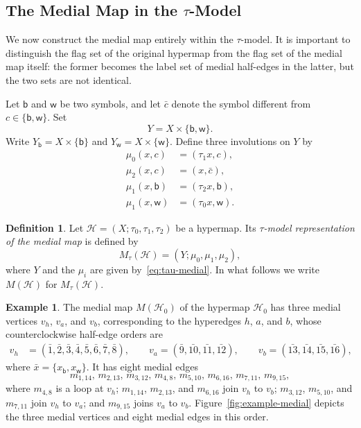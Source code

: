 \documentclass[10pt,a4paper]{article}
\theoremstyle{definition}
\newtheorem{definition}[theorem]{Definition}
\newtheorem{example}[theorem]{Example}
\theoremstyle{remark}
\newcommand{\Hcal}{\mathcal{H}}
\begin{document}
\subsection{The Medial Map in the $\tau$-Model}

We now construct the medial map entirely within the $\tau$-model. It is important to distinguish the flag set of the original hypermap from the flag set of the medial map itself: the former becomes the label set of medial half-edges in the latter, but the two sets are not identical.

Let $\mathsf b$ and $\mathsf w$ be two symbols, and let $\bar c$ denote the symbol different from $c\in\{\mathsf b,\mathsf w\}$. Set
\[
  Y=X\times\{\mathsf b,\mathsf w\}.
\]
Write $Y_{\mathsf b}=X\times\{\mathsf b\}$ and $Y_{\mathsf w}=X\times\{\mathsf w\}$. Define three involutions on $Y$ by
\[
\begin{aligned}
 \mu_0(x,c)&=(\tau_1x,c),\\
 \mu_2(x,c)&=(x,\bar c),\\
 \mu_1(x,\mathsf b)&=(\tau_2x,\mathsf b),\\
 \mu_1(x,\mathsf w)&=(\tau_0x,\mathsf w).
\end{aligned}
\tag{M}\label{eq:tau-medial}
\]

\begin{definition}\label{def:tau-medial}
Let $\Hcal=(X;\tau_0,\tau_1,\tau_2)$ be a hypermap. Its \emph{$\tau$-model representation of the medial map} is defined by
\[
 M_\tau(\Hcal)=(Y;\mu_0,\mu_1,\mu_2),
\]
where $Y$ and the $\mu_i$ are given by~\eqref{eq:tau-medial}. In what follows we write $M(\Hcal)$ for $M_\tau(\Hcal)$.
\end{definition}

\begin{example}
The medial map $M(\Hcal_0)$ of the hypermap $\Hcal_0$ has three medial vertices $v_h$, $v_a$, and $v_b$, corresponding to the hyperedges $h$, $a$, and $b$, whose counterclockwise half-edge orders are
\[
\begin{aligned}
v_h&=(\bar{1},\bar{2},\bar{3},\bar{4},\bar{5},\bar{6},\bar{7},\bar{8}),\qquad
v_a=(\bar{9},\bar{10},\bar{11},\bar{12}),\qquad
v_b=(\bar{13},\bar{14},\bar{15},\bar{16}),
\end{aligned}
\]
where $\bar x=\{x_{\mathsf b},x_{\mathsf w}\}$. It has eight medial edges
\[
m_{1,14},\,m_{2,13},\,m_{3,12},\,m_{4,8},\,
m_{5,10},\,m_{6,16},\,m_{7,11},\,m_{9,15},
\]
where $m_{4,8}$ is a loop at $v_h$; $m_{1,14}$, $m_{2,13}$, and $m_{6,16}$ join $v_h$ to $v_b$; $m_{3,12}$, $m_{5,10}$, and $m_{7,11}$ join $v_h$ to $v_a$; and $m_{9,15}$ joins $v_a$ to $v_b$.
Figure~\ref{fig:example-medial} depicts the three medial vertices and eight medial edges in this order. 
\end{example}
\end{document}
